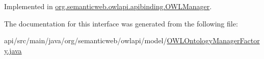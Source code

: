 Implemented in \hyperlink{classorg_1_1semanticweb_1_1owlapi_1_1apibinding_1_1_o_w_l_manager_a4975e012ebaf2b6b05130376d847d9e9}{org.\-semanticweb.\-owlapi.\-apibinding.\-O\-W\-L\-Manager}.



The documentation for this interface was generated from the following file\-:\begin{DoxyCompactItemize}
\item 
api/src/main/java/org/semanticweb/owlapi/model/\hyperlink{_o_w_l_ontology_manager_factory_8java}{O\-W\-L\-Ontology\-Manager\-Factory.\-java}\end{DoxyCompactItemize}
